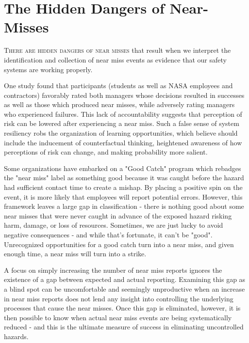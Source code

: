 \documentclass{tufte-handout}
\begin{document}
	\section{The Hidden Dangers of Near-Misses}\label{sec:HiddenDangers}
	\textsc{There are hidden dangers of near misses} that result when we interpret the identification and collection of near miss events as evidence that our safety systems are working properly.  
	
	One study \citep{MissedOpportunity} found that participants (students as well as NASA employees and contractors) favorably rated both managers whose decisions resulted in successes as well as those which produced near misses, while adversely rating managers who experienced failures.  This lack of accountability suggests that perception of risk can be lowered after experiencing a near miss.  Such a false sense of system resiliency robs the organization of learning opportunities, which \citeauthor{MissedOpportunity} believe should include the inducement of counterfactual thinking, heightened awareness of how perceptions of risk can change, and making probability	more salient.
	
	Some organizations have embarked on a "Good Catch" program which rebadges the "near miss" label as something good because it was caught before the hazard had sufficient contact time to create a mishap.  By placing a positive spin on the event, it is more likely that employees will report potential errors.  However, this framework leaves a large gap in classification - there is nothing good about some near misses that were never caught in advance of the exposed hazard risking harm, damage, or loss of resources.  Sometimes, we are just lucky to avoid negative consequences - and while that's fortunate, it can't be "good". Unrecognized opportunities for a good catch turn into a near miss, and given enough time, a near miss will turn into a strike.
	
	A focus on simply increasing the number of near miss reports ignores the existence of a gap between expected and actual reporting.  Examining this gap as a blind spot can be uncomfortable and seemingly unproductive when an increase in near miss reports does not lend any insight into controlling the underlying processes that cause the near misses.  Once this gap is eliminated, however, it is then possible to know when actual near miss events are being systematically reduced - and this is the ultimate measure of success in eliminating uncontrolled hazards.
	
\end{document}
